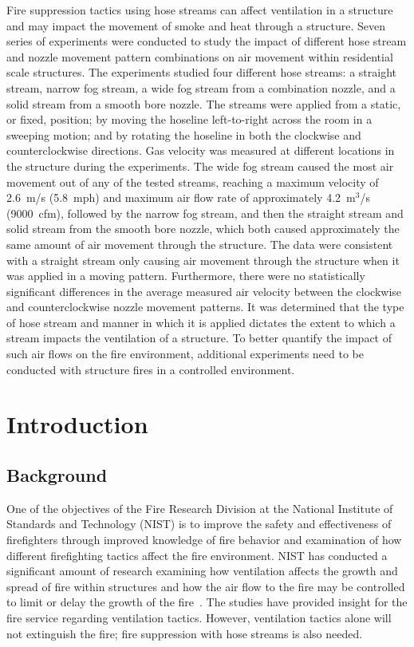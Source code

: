\documentclass[12pt,oneside]{book}
\begin{document}
Fire suppression tactics using hose streams can affect ventilation in a structure and may impact the movement of smoke and heat through a structure. Seven series of experiments were conducted to study the impact of different hose stream and nozzle movement pattern combinations on air movement within residential scale structures. The experiments studied four different hose streams: a straight stream, narrow fog stream, a wide fog stream from a combination nozzle, and a solid stream from a smooth bore nozzle. The streams were applied from a static, or fixed, position; by moving the hoseline left-to-right across the room in a sweeping motion; and by rotating the hoseline in both the clockwise and counterclockwise directions. Gas velocity was measured at different locations in the structure during the experiments. The wide fog stream caused the most air movement out of any of the tested streams, reaching a maximum velocity of 2.6~m/s (5.8~mph) and maximum air flow rate of approximately 4.2~m$^3$/s (9000~cfm), followed by the narrow fog stream, and then the straight stream and solid stream from the smooth bore nozzle, which both caused approximately the same amount of air movement through the structure. The data were consistent with a straight stream only causing air movement through the structure when it was applied in a moving pattern. Furthermore, there were no statistically significant differences in the average measured air velocity between the clockwise and counterclockwise nozzle movement patterns. It was determined that the type of hose stream and manner in which it is applied dictates the extent to which a stream impacts the ventilation of a structure. To better quantify the impact of such air flows on the fire environment, additional experiments need to be conducted with structure fires in a controlled environment.

\mainmatter

\chapter{Introduction}
\label{chap:intro}
\section{Background}
\label{sec:background}

One of the objectives of the Fire Research Division at the National Institute of Standards and Technology (NIST) is to improve the safety and effectiveness of firefighters through improved knowledge of fire behavior and examination of how different firefighting tactics affect the fire environment. NIST has conducted a significant amount of research examining how ventilation affects the growth and spread of fire within structures and how the air flow to the fire may be controlled to limit or delay the growth of the fire~\cite{madrzykowski2009fire,kerber2009fire}. The studies have provided insight for the fire service regarding ventilation tactics. However, ventilation tactics alone will not extinguish the fire; fire suppression with hose streams is also needed.
\end{document}
